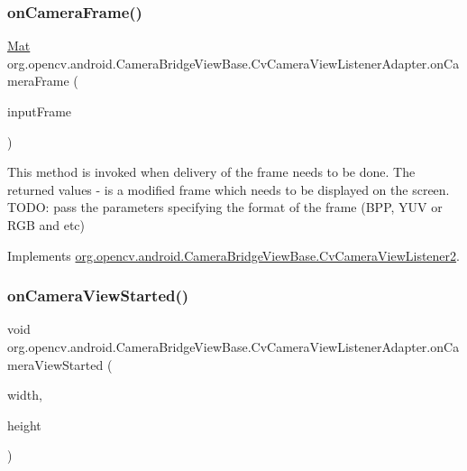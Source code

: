 \subsubsection{\texorpdfstring{on\+Camera\+Frame()}{onCameraFrame()}}
{\footnotesize\ttfamily \mbox{\hyperlink{classorg_1_1opencv_1_1core_1_1_mat}{Mat}} org.\+opencv.\+android.\+Camera\+Bridge\+View\+Base.\+Cv\+Camera\+View\+Listener\+Adapter.\+on\+Camera\+Frame (\begin{DoxyParamCaption}\item[{\mbox{\hyperlink{interfaceorg_1_1opencv_1_1android_1_1_camera_bridge_view_base_1_1_cv_camera_view_frame}{Cv\+Camera\+View\+Frame}}}]{input\+Frame }\end{DoxyParamCaption})}

This method is invoked when delivery of the frame needs to be done. The returned values -\/ is a modified frame which needs to be displayed on the screen. T\+O\+DO\+: pass the parameters specifying the format of the frame (B\+PP, Y\+UV or R\+GB and etc) 

Implements \mbox{\hyperlink{interfaceorg_1_1opencv_1_1android_1_1_camera_bridge_view_base_1_1_cv_camera_view_listener2_aa8cf69267ec5580344728dbadbf6ae0f}{org.\+opencv.\+android.\+Camera\+Bridge\+View\+Base.\+Cv\+Camera\+View\+Listener2}}.

\mbox{\label{classorg_1_1opencv_1_1android_1_1_camera_bridge_view_base_1_1_cv_camera_view_listener_adapter_ac3c80b8f6b63af5c9f0e0239afb0ea92}} 
\subsubsection{\texorpdfstring{on\+Camera\+View\+Started()}{onCameraViewStarted()}}
{\footnotesize\ttfamily void org.\+opencv.\+android.\+Camera\+Bridge\+View\+Base.\+Cv\+Camera\+View\+Listener\+Adapter.\+on\+Camera\+View\+Started (\begin{DoxyParamCaption}\item[{int}]{width,  }\item[{int}]{height }\end{DoxyParamCaption})}

